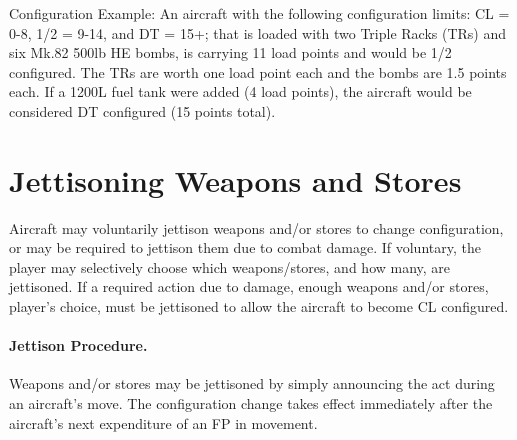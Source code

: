 \begin{advancedrules}
Configuration Example: An aircraft with the following configuration limits: CL = 0-8, 1/2 = 9-14, and DT = 15+; that is loaded with two Triple Racks (TRs) and six Mk.82 500lb HE bombs, is carrying 11 load points and would be 1/2 configured. The TRs are worth one load point each and the bombs are 1.5 points each. If a 1200L fuel tank were added (4 load points), the aircraft would be considered DT configured (15 points total).

\section{Jettisoning Weapons and Stores}
\label{rules:jettisoning-stores}

Aircraft may voluntarily jettison weapons and/or stores to change configuration, or may be required to jettison them due to combat damage. If voluntary, the player may selectively choose which weapons/stores, and how many, are jettisoned. If a required action due to damage, enough weapons and/or stores, player's choice, must be jettisoned to allow the aircraft to become CL configured.

\paragraph{Jettison Procedure.} 
Weapons and/or stores may be jettisoned by simply announcing the act during an aircraft's move. The configuration change takes effect immediately after the aircraft's next expenditure of an FP in movement.

\end{advancedrules}
